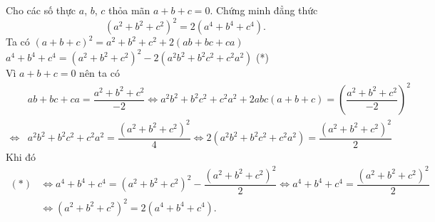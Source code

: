 \begin{ex}%
 Cho các số thực $a$, $b$, $c$ thỏa mãn $a + b + c = 0$. Chứng minh đẳng thức
 $$\left( a^2 + b^2 + c^2 \right)^2 = 2 \left( a^4 + b^4 + c^4 \right).$$
 \loigiai
  {
  Ta có $(a + b + c)^2 = a^2 + b^2 + c^2 + 2(ab + bc + ca)$\\
  \hspace*{1cm} $a^4 + b^4 + c^4 = \left( a^2 + b^2 + c^2 \right)^2 - 2 \left( a^2b^2 + b^2c^2 + c^2a^2\right)$ \hfill (*)\\
  Vì $a + b + c = 0$ nên ta có
  \begin{align*}
   & ab + bc + ca = \dfrac{a^2 + b^2 + c^2}{-2} \Leftrightarrow a^2b^2 + b^2c^2 + c^2a^2 + 2abc(a + b + c) = \left( \dfrac{a^2 + b^2 + c^2}{-2} \right)^2 \\
   \Leftrightarrow & a^2b^2 + b^2c^2 + c^2a^2 = \dfrac{\left( a^2 + b^2 + c^2 \right)^2}{4} \Leftrightarrow 2 \left( a^2b^2 + b^2c^2 + c^2a^2 \right) = \dfrac{\left( a^2 + b^2 + c^2 \right)^2}{2}
  \end{align*}
  Khi đó
  \begin{align*}
   (*) & \Leftrightarrow a^4 + b^4 + c^4 = \left( a^2 + b^2 + c^2 \right)^2 - \dfrac{\left( a^2 + b^2 + c^2 \right)^2}{2} \Leftrightarrow a^4 + b^4 + c^4 = \dfrac{\left( a^2 + b^2 + c^2 \right)^2}{2} \\
    & \Leftrightarrow \left( a^2 + b^2 + c^2 \right)^2 = 2 \left( a^4 + b^4 + c^4 \right).
  \end{align*}
  }
\end{ex}


